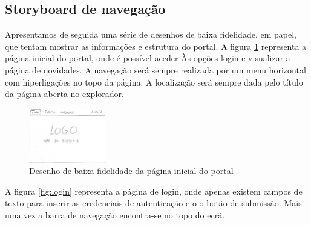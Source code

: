 \FloatBarrier\subsection{Storyboard de navegação}



Apresentamos de seguida uma série de desenhos de baixa fidelidade, em papel, que tentam mostrar as informações e estrutura do portal.
A figura \ref{fig:inicio} representa a página inicial do portal, onde é possível aceder Às opções login e visualizar a página de novidades. A navegação será sempre realizada por um menu horizontal com hiperligações no topo da página. A localização será sempre dada pelo título da página aberta no explorador.

\begin{figure}[!htb]
	\centering
	\includegraphics[width=0.3\textwidth, frame]{figuras/storyboard/frame_0.jpg}
	\caption{Desenho de baixa fidelidade da página inicial do portal}
	\label{fig:inicio}
\end{figure}

A figura \ref{fig:login} representa a página de login, onde apenas existem campos de texto para inserir as credenciais de autenticação e o o botão de submissão. Mais uma vez a barra de navegação encontra-se no topo do ecrã.

